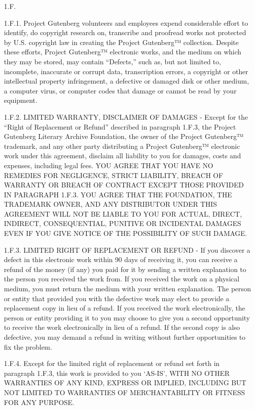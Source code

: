 1.F.

1.F.1. Project Gutenberg volunteers and employees expend considerable
effort to identify, do copyright research on, transcribe and proofread
works not protected by U.S. copyright law in creating the Project
Gutenberg™ collection. Despite these efforts, Project Gutenberg™
electronic works, and the medium on which they may be stored, may
contain “Defects,” such as, but not limited to, incomplete, inaccurate
or corrupt data, transcription errors, a copyright or other
intellectual property infringement, a defective or damaged disk or
other medium, a computer virus, or computer codes that damage or
cannot be read by your equipment.

1.F.2. LIMITED WARRANTY, DISCLAIMER OF DAMAGES - Except for the “Right
of Replacement or Refund” described in paragraph 1.F.3, the Project
Gutenberg Literary Archive Foundation, the owner of the Project
Gutenberg™ trademark, and any other party distributing a Project
Gutenberg™ electronic work under this agreement, disclaim all
liability to you for damages, costs and expenses, including legal
fees. YOU AGREE THAT YOU HAVE NO REMEDIES FOR NEGLIGENCE, STRICT
LIABILITY, BREACH OF WARRANTY OR BREACH OF CONTRACT EXCEPT THOSE
PROVIDED IN PARAGRAPH 1.F.3. YOU AGREE THAT THE FOUNDATION, THE
TRADEMARK OWNER, AND ANY DISTRIBUTOR UNDER THIS AGREEMENT WILL NOT BE
LIABLE TO YOU FOR ACTUAL, DIRECT, INDIRECT, CONSEQUENTIAL, PUNITIVE OR
INCIDENTAL DAMAGES EVEN IF YOU GIVE NOTICE OF THE POSSIBILITY OF SUCH
DAMAGE.

1.F.3. LIMITED RIGHT OF REPLACEMENT OR REFUND - If you discover a
defect in this electronic work within 90 days of receiving it, you can
receive a refund of the money (if any) you paid for it by sending a
written explanation to the person you received the work from. If you
received the work on a physical medium, you must return the medium
with your written explanation. The person or entity that provided you
with the defective work may elect to provide a replacement copy in
lieu of a refund. If you received the work electronically, the person
or entity providing it to you may choose to give you a second
opportunity to receive the work electronically in lieu of a refund. If
the second copy is also defective, you may demand a refund in writing
without further opportunities to fix the problem.

1.F.4. Except for the limited right of replacement or refund set forth
in paragraph 1.F.3, this work is provided to you ‘AS-IS’, WITH NO
OTHER WARRANTIES OF ANY KIND, EXPRESS OR IMPLIED, INCLUDING BUT NOT
LIMITED TO WARRANTIES OF MERCHANTABILITY OR FITNESS FOR ANY PURPOSE.

